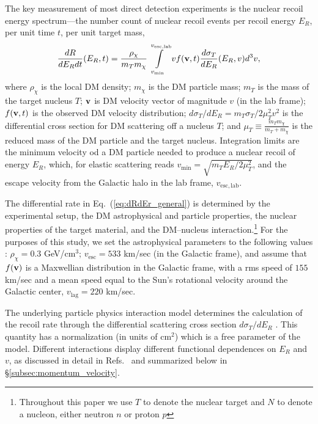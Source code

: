 \documentclass[11pt]{article}
\newcommand{\Eq}[1]{Eq.~(\ref{#1})} \newcommand{\Eqs}[2]{Eqs.~(\ref{#1}) and (\ref{#2})} \newcommand{\Eqm}[2]{Eqs.~(\ref{#1}) through (\ref{#2})}
\begin{document}
The key measurement of most direct detection experiments is the nuclear recoil energy spectrum---the number count of nuclear recoil events per recoil energy $E_R$, per unit time $t$, per unit target mass,
\begin{equation}
\frac{dR}{dE_R dt}(E_R,t) =  \frac{\rho_\chi}{m_T m_\chi} \int\limits_{v_{\mathrm{min}}}^{v_{\mathrm{esc, lab}}}  v f(\mathrm{\mbox{\bf{v}}},t) \frac{d\sigma_T}{dE_R} (E_R,v) d^3v ,
\label{eq:dRdEr_general}
\end{equation}
where $\rho_\chi$ is the local DM density; $m_\chi$ is the DM particle mass; $m_T$ is the mass of the target nucleus $T$; $\mathrm{\mbox{\bf{v}}}$ is DM velocity vector of magnitude $v$ (in the lab frame); $f(\mathrm{\mbox{\bf{v}}}, t)$ is the observed DM velocity distribution; $d\sigma_T/dE_R=m_T \sigma_T /2\mu_T^2 v^2$ is the differential cross section for DM scattering off a nucleus $T$; and $\mu_T\equiv\frac{m_Tm_\chi}{m_T+m_\chi}$ is the reduced mass of the DM particle and the target nucleus. Integration limits are the minimum velocity od a DM particle needed to produce a nuclear recoil of energy $E_R$, which, for elastic scattering reads $v_\mathrm{min} = \sqrt{m_T E_R/2\mu_T^2}$, and the escape velocity from the Galactic halo in the lab frame, $v_{\mathrm{esc, lab}}$.

The differential rate in \Eq{eq:dRdEr_general} is determined by the experimental setup, the DM astrophysical and particle properties, the nuclear properties of the target material, and the DM--nucleus interaction.\footnote{Throughout this paper we use $T$ to denote the nuclear target and $N$ to denote a nucleon, either neutron $n$ or proton $p$} For the purposes of this study, we set the astrophysical parameters to the following values \cite{Bovy:2013raa,Piffl:2013mla}: $\rho_\chi=0.3$ GeV/cm$^3$; $v_{\mathrm{esc}} = 533$ km/sec (in the Galactic frame), and assume that $f(\mathrm{\mbox{\bf{v}}})$ is a Maxwellian distribution in the Galactic frame, with a rms speed of $155$ km/sec and a mean speed equal to the Sun's rotational velocity around the Galactic center, $v_\textrm{lag}=220$ km/sec.

The underlying particle physics interaction model determines the calculation of the recoil rate through the differential scattering cross section ${d\sigma_T}/{dE_R}$ \cite{Gluscevic:2015sqa,Gresham:2014vja}. This quantity has a normalization (in units of cm${}^2$) which is a free parameter of the model. Different interactions display different functional dependences on $E_R$ and $v$, as discussed in detail in Refs.~\cite{Gluscevic:2015sqa,Gresham:2014vja} and summarized below in \S\ref{subsec:momentum_velocity}.
\end{document}
